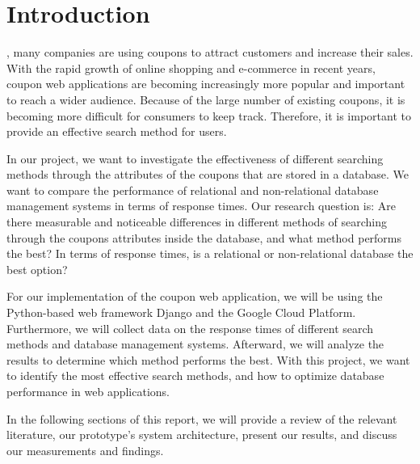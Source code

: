 \section{Introduction}
, many companies are using coupons to attract customers and increase their sales. With the rapid growth of online
shopping and e-commerce in recent years, coupon web applications are becoming increasingly more popular and important to reach a wider audience. Because of the large number of existing coupons, it is becoming more difficult for consumers to keep track. Therefore, it is important to provide an effective search method for users.

In our project, we want to investigate the effectiveness of different searching methods through the attributes of the coupons that are stored in a database. We want to compare the performance of relational and non-relational database management systems in terms of response times. Our research question is: Are there measurable and noticeable differences in different methods of searching through the coupons attributes inside the database, and what method performs the best? In terms of response times, is a relational or non-relational database the best option?

For our implementation of the coupon web application, we will be using the Python-based web framework Django and the Google Cloud Platform. Furthermore, we will collect data on the response times of different search methods and database management systems. Afterward, we will analyze the results to determine which method performs the best. With this project, we want to identify the most effective search methods, and how to optimize database performance in web applications.

In the following sections of this report, we will provide a review of the relevant literature, our prototype’s system architecture, present our results, and discuss our measurements and findings.